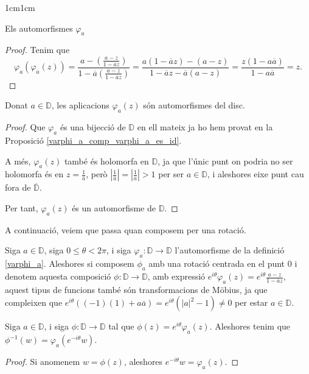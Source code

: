 \begin{adjustwidth}{1cm}{1cm}
\begin{subsection}{Els automorfismes \texorpdfstring{$\varphi_a$}{C}}
\begin{proof}
    Tenim que
    \[
        \varphi_a(\varphi_a(z))=\frac{a-(\frac{a-z}{1-\overline{a}z})}{1-\overline{a}(\frac{a-z}{1-\overline{a}z})}=\frac{a(1-\overline{a}z)-(a-z)}{1-\overline{a}z-\overline{a}(a-z)}=\frac{z(1-a\overline{a})}{1-a\overline{a}}=z.
    \]
\end{proof}

\begin{proposicio}
    Donat $a\in \mathbb{D}$, les aplicacions $\varphi_a(z)$ són automorfismes del disc.
    \label{varphi_a_prop}
\end{proposicio} 

\begin{proof}
    Que $\varphi_a$ és una bijecció de $\mathbb{D}$ en ell mateix ja ho hem provat en la Proposició \ref{varphi_a_comp_varphi_a_es_id}.
    
    A més, $\varphi_a(z)$ també és holomorfa en $\mathbb{D}$, ja que l'únic punt on podria no ser holomorfa és en $z=\frac{1}{\overline{a}}$, però $\left|\frac{1}{\overline{a}}\right|=\left|\frac{1}{a}\right|>1$ per ser $a\in \mathbb{D}$, i aleshores eixe punt cau fora de $\overline{\mathbb{D}}$.
    
    Per tant, $\varphi_a(z)$ és un automorfisme de $\mathbb{D}$.
\end{proof}

A continuació, veiem que passa quan composem per una rotació.

\begin{nota}
    Siga $a\in\mathbb{D}$, siga $0\leq\theta<2\pi$, i siga $\varphi_a:\mathbb{D}\to\mathbb{D}$ l'automorfisme de la definició \ref{varphi_a}. Aleshores si composem $\phi_a$ amb una rotació centrada en el punt $0$ i denotem aquesta composició $\phi:\mathbb{D}\to \mathbb{D}$, amb expressió $e^{i\theta}\varphi_a(z)=e^{i\theta}\frac{a-z}{1-\overline{a}z}$, aquest tipus de funcions també són transformacions de Möbius, ja que compleixen que $e^{i\theta}((-1)(1)+a\overline{a})=e^{i\theta}(|a|^2-1)\neq 0$ per estar $a\in \mathbb{D}$.
\end{nota}

\begin{proposicio}
    Siga $a\in \mathbb{D}$, i siga $\phi:\mathbb{D}\to \mathbb{D}$ tal que $\phi(z)=e^{i\theta}\varphi_a(z)$. Aleshores tenim que $\phi^{-1}(w)=\varphi_a(e^{-i\theta}w)$.
    \label{inv_phi}
\end{proposicio}

\begin{proof}
    Si anomenem $w=\phi(z)$, aleshores $e^{-i\theta}w=\varphi_a(z)$.


\end{proof}
\end{subsection}
\end{adjustwidth}
